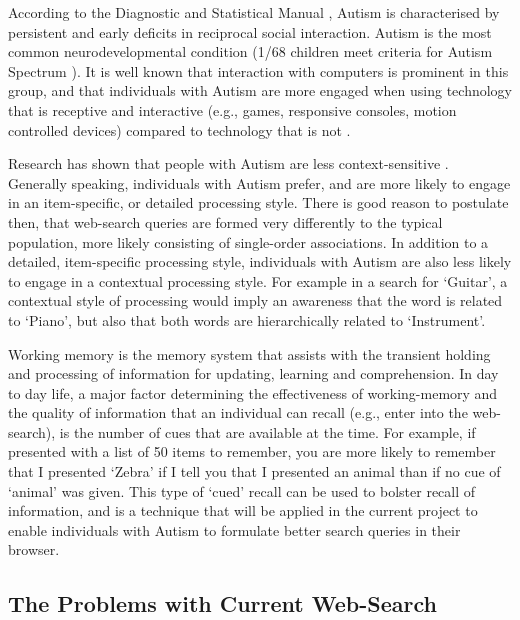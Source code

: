 \documentclass[a4paper, 11pt]{article}
\begin{document}
According to the Diagnostic and Statistical Manual \cite{CDC}, Autism is characterised by persistent and early deficits in reciprocal social interaction. Autism is the most common neurodevelopmental condition (1/68 children meet criteria for Autism Spectrum \cite{CDC}). It is well known that interaction with computers is prominent in this group, and that individuals with Autism are more engaged when using technology that is receptive and interactive (e.g., games, responsive consoles, motion controlled devices) compared to technology that is not \cite{motioncontrollerforautism}. 

\vspace{5mm}
Research has shown that people with Autism are less context-sensitive \cite{mottron}. Generally speaking, individuals with Autism prefer, and are more likely to engage in an item-specific, or detailed processing style. There is good reason to postulate then, that web-search queries are formed very differently to the typical population, more likely consisting of single-order associations. In addition to a detailed, item-specific processing style, individuals with Autism are also less likely to engage in a contextual processing style. For example in a search for `Guitar', a contextual style of processing would imply an awareness that the word is related to `Piano', but also that both words are hierarchically related to `Instrument'. 

\vspace{5mm}
Working memory is the memory system that assists with the transient holding and processing of information for updating, learning and comprehension. In day to day life, a major factor determining the effectiveness of working-memory and the quality of information that an individual can recall (e.g., enter into the web-search), is the number of cues that are available at the time. For example, if presented with a list of 50 items to remember, you are more likely to remember that I presented `Zebra' if I tell you that I presented an animal than if no cue of `animal' was given. This type of `cued' recall can be used to bolster recall of information, and is a technique that will be applied in the current project to enable individuals with Autism to formulate better search queries in their browser. \\

\subsection{The Problems with Current Web-Search}\label{What should search offer people with Autism}
\end{document}
